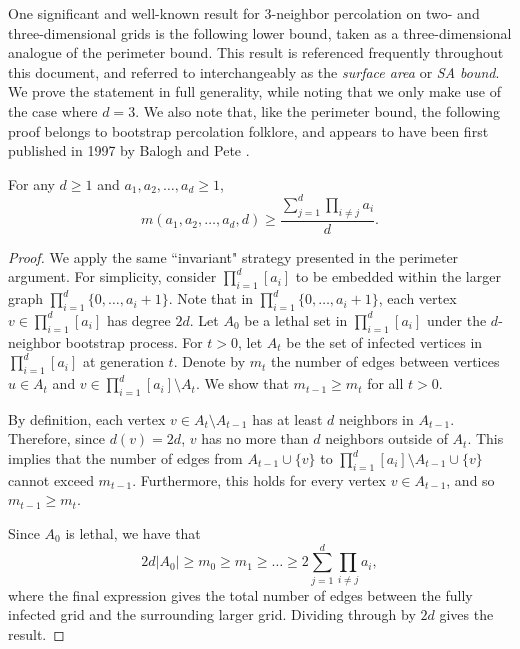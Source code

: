 One significant and well-known result for 3-neighbor percolation on two- and three-dimensional grids is the following lower bound, taken as a three-dimensional analogue of the perimeter bound. This result is referenced frequently throughout this document, and referred to interchangeably as the \emph{surface area} or \emph{SA bound}. We prove the statement in full generality, while noting that we only make use of the case where $d=3$. We also note that, like the perimeter bound, the following proof belongs to bootstrap percolation folklore, and appears to have been first published in 1997 by Balogh and Pete \cite{balogh_and_pete}.

\begin{thm}
\label{thm:sa_bound}
For any $d \geq 1$ and $a_1, a_2, \dots, a_d \geq 1$, 
$$m(a_1,a_2, \dots, a_d,d) \geq \frac{\sum_{j=1}^d \prod_{i \neq j} a_i}{d}.$$
\end{thm}

\begin{proof}
We apply the same ``invariant" strategy presented in the perimeter argument. For simplicity, consider $\prod_{i=1}^d[a_i]$ to be embedded within the larger graph $\prod_{i=1}^d \{0, \dots, a_i + 1\}$. Note that in $\prod_{i=1}^d \{0, \dots, a_i + 1\}$, each vertex $v \in \prod_{i=1}^d[a_i]$ has degree $2d$. Let $A_0$ be a lethal set in $\prod_{i=1}^d[a_i]$ under the $d$-neighbor bootstrap process. For $t >0$, let $A_t$ be the set of infected vertices in $\prod_{i=1}^d[a_i]$ at generation $t$. Denote by $m_t$ the number of edges between vertices $u \in A_t$ and $v \in \prod_{i=1}^d[a_i] \setminus A_t$. %
We show that $m_{t-1} \geq m_t$ for all $t> 0$. 

By definition, each vertex $v \in A_t \setminus A_{t-1}$ has at least $d$ neighbors in $A_{t-1}$. Therefore, since $d(v) = 2d$, $v$ has no more than $d$ neighbors outside of $A_t$. This implies that the number of edges from $A_{t-1} \cup \{v\}$ to $\prod_{i=1}^d[a_i] \setminus A_{t-1} \cup \{v\}$ cannot exceed $m_{t-1}$. Furthermore, this holds for every vertex $v \in A_{t-1}$, and so $m_{t-1} \geq m_t$. 

Since $A_0$ is lethal, we have that 
$$2d|A_0| \geq m_0 \geq m_1 \geq \dots \geq 2 \sum_{j=1}^d \prod_{i \neq j} a_i,$$ 
where the final expression gives the total number of edges between the fully infected grid and the surrounding larger grid. Dividing through by $2d$ gives the result.
\end{proof}

